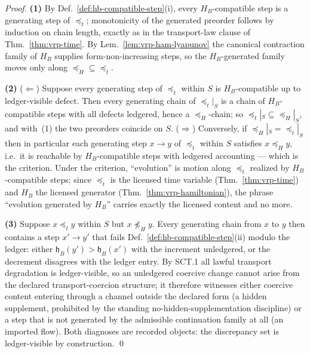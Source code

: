 \documentclass[12pt,oneside]{amsbook}
\theoremstyle{plain}
\theoremstyle{definition}
\theoremstyle{remark}
\begin{document}
\begin{proof}
\textbf{(1)}  By Def.~\ref{def:hb-compatible-step}(i), every
$H_B$-compatible step is a generating step of $\preceq_t$;
monotonicity of the generated preorder follows by induction on
chain length, exactly as in the transport-law clause of
Thm.~\ref{thm:vrp-time}.  By Lem.~\ref{lem:vrp-ham-lyapunov} the
canonical contraction family of $H_B$ supplies form-non-increasing
steps, so the $H_B$-generated family moves only along
$\preceq_H \subseteq \preceq_t$.

\textbf{(2)}  ($\Leftarrow$)  Suppose every generating step of
$\preceq_t$ within $S$ is $H_B$-compatible up to ledger-visible
defect.  Then every generating chain of $\preceq_t|_S$ is a chain
of $H_B$-compatible steps with all defects ledgered, hence a
$\preceq_H$-chain; so $\preceq_t|_S \subseteq \preceq_H|_S$, and
with~(1) the two preorders coincide on $S$.  ($\Rightarrow$)
Conversely, if $\preceq_H|_S = \preceq_t|_S$ then in particular
each generating step $x \to y$ of $\preceq_t$ within $S$ satisfies
$x \preceq_H y$, i.e.\ it is reachable by $H_B$-compatible steps
with ledgered accounting --- which is the criterion.  Under the
criterion, ``evolution'' is motion along $\preceq_t$ realized by
$H_B$-compatible steps; since $\preceq_t$ is the licensed time
variable (Thm.~\ref{thm:vrp-time}) and $H_B$ the licensed
generator (Thm.~\ref{thm:vrp-hamiltonian}), the phrase
``evolution generated by $H_B$'' carries exactly the licensed
content and no more.

\textbf{(3)}  Suppose $x \preceq_t y$ within $S$ but
$x \not\preceq_H y$.  Every generating chain from $x$ to $y$ then
contains a step $x' \to y'$ that fails
Def.~\ref{def:hb-compatible-step}(ii) modulo the ledger: either
$\mathfrak{h}_B(y') > \mathfrak{h}_B(x')$ with the increment
unledgered, or the decrement disagrees with the ledger entry.  By
SCT.1 all lawful transport degradation is ledger-visible, so an
unledgered coercive change cannot arise from the declared
transport-coercion structure; it therefore witnesses either
coercive content entering through a channel outside the declared
form (a hidden supplement, prohibited by the standing
no-hidden-supplementation discipline) or a step that is not
generated by the admissible continuation family at all (an
imported flow).  Both diagnoses are recorded objects: the
discrepancy set is ledger-visible by construction. \qed
\end{proof}
\end{document}

